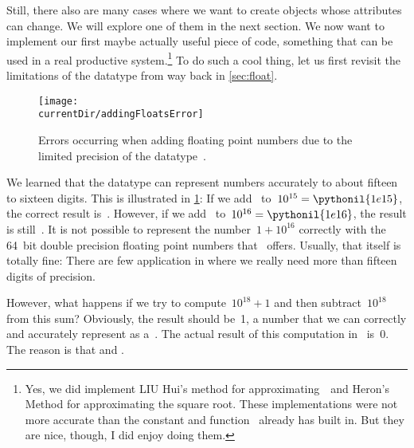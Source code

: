 Still, there also are many cases where we want to create objects whose attributes can change.
We will explore one of them in the next section.%
\FloatBarrier%
\endhsection%
%
%
%
We now want to implement our first maybe actually useful piece of code, something that can be used in a real productive system.\footnote{%
Yes, we did implement LIU Hui's method for approximating~\numberPi\ and Heron's Method for approximating the square root. %
These implementations were not more accurate than the constant and function \python\ already has built in. %
But they are nice, though, I did enjoy doing them.}
To do such a cool thing, let us first revisit the limitations of the datatype  from way back in \cref{sec:float}. %
%
\begin{figure}%
\centering%
\texttt{[image: \\currentDir/addingFloatsError]}%
\caption{Errors occurring when adding floating point numbers due to the limited precision of the datatype~.}%
\label{fig:addingFloatsError}%
\end{figure}%
%
We learned that the datatype  can represent numbers accurately to about fifteen to sixteen digits.
This is illustrated in \cref{fig:addingFloatsError}:
If we add~ to~$10^{15}=\pythonil{1e15}$, the correct result is~.
However, if we add~ to~$10^{16}=\pythonil{1e16}$, the result is still~.
It is not possible to represent the number~$1+10^{16}$ correctly with the 64~bit double precision floating point numbers that \python\ offers.
Usually, that itself is totally fine:
There are few application in  where we really need more than fifteen digits of precision.

However, what happens if we try to compute~$10^{18}+1$ and then subtract~$10^{18}$ from this sum?
Obviously, the result should be~1, a number that we can correctly and accurately represent as a~.
The actual result of this computation in \python\ is~0.
The reason is that  and .

